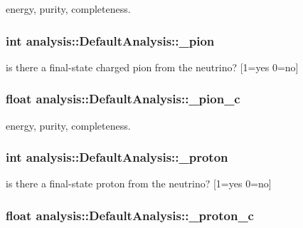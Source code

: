 energy, purity, completeness. \hypertarget{classanalysis_1_1DefaultAnalysis_ac146d38b0cac5f30ea28c76f21cacdb1}{
\subsubsection[{\-\_\-pion}]{\setlength{\rightskip}{0pt plus 5cm}int analysis\-::\-Default\-Analysis\-::\-\_\-pion\hspace{0.3cm}{\ttfamily [private]}}}\label{classanalysis_1_1DefaultAnalysis_ac146d38b0cac5f30ea28c76f21cacdb1}
is there a final-\/state charged pion from the neutrino? \mbox{[}1=yes 0=no\mbox{]} \hypertarget{classanalysis_1_1DefaultAnalysis_a9978effbcfba62536fc88a73fa985fe9}{
\subsubsection[{\-\_\-pion\-\_\-c}]{\setlength{\rightskip}{0pt plus 5cm}float analysis\-::\-Default\-Analysis\-::\-\_\-pion\-\_\-c\hspace{0.3cm}{\ttfamily [private]}}}\label{classanalysis_1_1DefaultAnalysis_a9978effbcfba62536fc88a73fa985fe9}
energy, purity, completeness. \hypertarget{classanalysis_1_1DefaultAnalysis_a8fd1f5d981dc5860f0c829c2b88a1363}{
\subsubsection[{\-\_\-proton}]{\setlength{\rightskip}{0pt plus 5cm}int analysis\-::\-Default\-Analysis\-::\-\_\-proton\hspace{0.3cm}{\ttfamily [private]}}}\label{classanalysis_1_1DefaultAnalysis_a8fd1f5d981dc5860f0c829c2b88a1363}
is there a final-\/state proton from the neutrino? \mbox{[}1=yes 0=no\mbox{]} \hypertarget{classanalysis_1_1DefaultAnalysis_a643cc086bdfa4332ced72f6d4e5ce233}{
\subsubsection[{\-\_\-proton\-\_\-c}]{\setlength{\rightskip}{0pt plus 5cm}float analysis\-::\-Default\-Analysis\-::\-\_\-proton\-\_\-c\hspace{0.3cm}{\ttfamily [private]}}}\label{classanalysis_1_1DefaultAnalysis_a643cc086bdfa4332ced72f6d4e5ce233}
